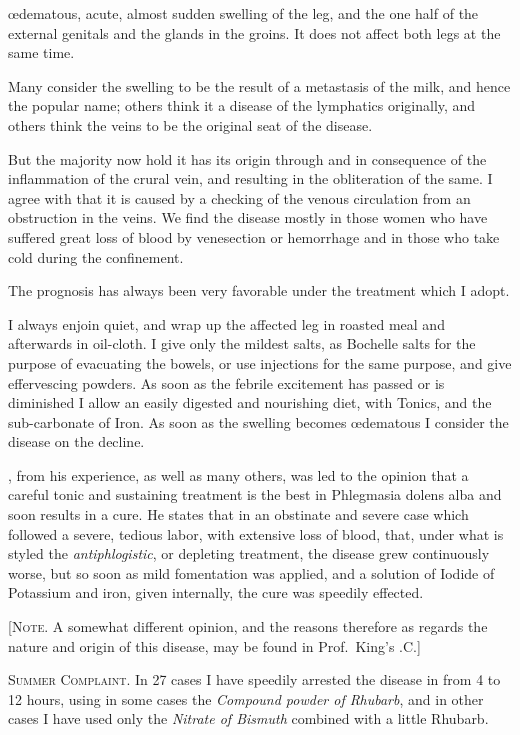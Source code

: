 œdematous, acute, almost sudden swelling of the leg, and the one half
of the external genitals and the glands in the groins. It does not
affect both legs at the same time.

Many consider the swelling to be the result of a metastasis of the
milk, and hence the popular name; others think it a disease of the
lymphatics originally, and others think the veins to be the original
seat of the disease.

But the majority now hold it has its origin through and in consequence
of the inflammation of the crural vein, and resulting in the
obliteration of the same. I agree with  that it is caused by a
checking of the venous circulation from an obstruction in the veins.
We find the disease mostly in those women who have suffered great
loss of blood by venesection or hemorrhage and in those who take cold
during the confinement.

The prognosis has always been very favorable under the treatment
which I adopt.

I always enjoin quiet, and wrap up the affected leg in roasted meal
and afterwards in oil-cloth. I give only the mildest salts, as Bochelle
salts for the purpose of evacuating the bowels, or use injections for
the same purpose, and give effervescing powders. As soon as the
febrile excitement has passed or is diminished I allow an easily digested
and nourishing diet, with Tonics, and the sub-carbonate of Iron. As
soon as the swelling becomes œdematous I consider the disease on the
decline.

, from his experience, as well as many others, was led
to the opinion that a careful tonic and sustaining treatment is the best
in Phlegmasia dolens alba and soon results in a cure. He states that
in an obstinate and severe case which followed a severe, tedious labor,
with extensive loss of blood, that, under what is styled the \emph{antiphlogistic},
or depleting treatment, the disease grew continuously worse, but
so soon as mild fomentation was applied, and a solution of Iodide of
Potassium and iron, given internally, the cure was speedily effected.

[\textsc{Note}. A somewhat different opinion, and the reasons therefore as
regards the nature and origin of this disease, may be found in Prof.~King's
.\hfill{}C.\quad{}]

\textsc{Summer Complaint}. In 27 cases I have speedily arrested the disease
in from 4 to 12 hours, using in some cases the \emph{Compound powder
of Rhubarb}, and in other cases I have used only the \emph{Nitrate of Bismuth}
combined with a little Rhubarb.\endinput

